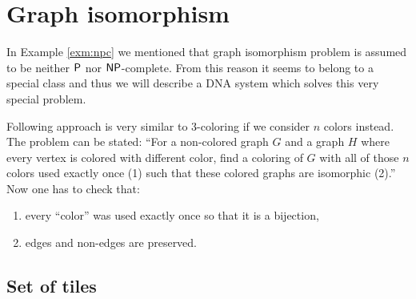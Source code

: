\section{Graph isomorphism}

In Example \ref{exm:npc} we mentioned that graph isomorphism problem is assumed to be neither $\P$ nor $\NP$-complete. From this reason it seems to belong to a special class and thus we will describe a DNA system which solves this very special problem. %

Following approach is very similar to 3-coloring if we consider $n$ colors instead. The problem can be stated: ``For a non-colored graph $G$ and a graph $H$ where every vertex is colored with different color, find a coloring of $G$ with all of those $n$ colors used exactly once (1) such that these colored graphs are isomorphic (2).'' Now one has to check that:
\begin{enumerate}
	\item every ``color'' was used exactly once so that it is a bijection,
	\item edges and non-edges are preserved.
\end{enumerate}

\subsection*{Set of tiles}

